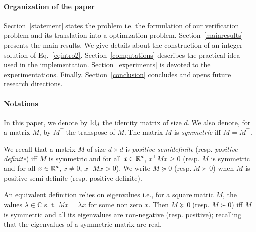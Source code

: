 \documentclass[10pt]{llncs}
\begin{document}

\paragraph{Organization of the paper}
Section~\ref{statement} states the problem i.e. the formulation of our verification problem and its translation into a optimization problem. Section~\ref{mainresults} presents the main results. We give details about the construction of an integer solution of Eq.~\eqref{eqintro2}. Section~\ref{computations} describes the practical idea used in the implementation.  Section~\ref{experiments} is devoted to the experimentations. Finally, Section~\ref{conclusion} concludes and opens future research directions.


\paragraph{Notations}
In this paper, we denote by $\operatorname{Id}_d$ the identity matrix of size $d$.
We also denote, for a matrix $M$, by $M^\intercal$ the transpose of $M$. The matrix $M$ is {\it symmetric} iff $M=M^\intercal$.

We recall that a matrix $M$ of size $d\times d$ is {\it positive semidefinite} (resp. {\it positive definite}) iff $M$ is symmetric and for all $x\in\mathbb R^d$, $x^\intercal M x\geq 0$ (resp. $M$ is symmetric and for all $x\in\mathbb R^d$, $x\neq 0$, $x^\intercal M x> 0$). We write $M\succeq 0$ (resp. $M\succ 0$)  when $M$ is positive semi-definite (resp. positive definite).

An equivalent definition relies on eigenvalues i.e., for a square matric $M$, the values $\lambda\in\mathbb C$ s. t. $Mx=\lambda x$ for some non zero $x$. Then $M\succeq 0$ (resp. $M\succ 0$) iff $M$ is symmetric and all its eigenvalues are non-negative (resp. positive); recalling that the eigenvalues of a symmetric matrix are real.
\end{document}
